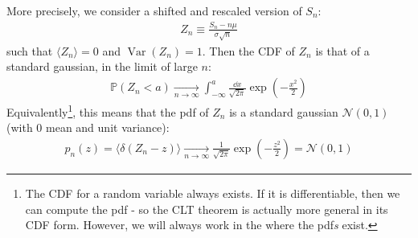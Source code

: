 \documentclass[../template.tex]{subfiles}
\begin{document}
\medskip

More precisely, we consider a shifted and rescaled version of $S_n$:
\begin{align*}
    Z_n \equiv \frac{S_n - n \mu}{\sigma\sqrt{n}} 
\end{align*}
such that $\langle Z_n \rangle = 0$ and $\operatorname{Var}(Z_n) = 1$. Then the CDF of $Z_n$ is that of a standard gaussian, in the limit of large $n$:
\begin{align*}
    \mathbb{P}(Z_n < a)  \xrightarrow[n \to \infty]{}  \int_{-\infty}^a \frac{\dd{x}}{\sqrt{2 \pi}}  \exp\left(-\frac{x^2}{2} \right) 
\end{align*} 
Equivalently\footnote{The CDF for a random variable always exists. If it is differentiable, then we can compute the pdf - so the CLT theorem is actually more general in its CDF form. However, we will always work in the  where the pdf\textit{s}  exist.},%
 this means that the pdf of $Z_n$ is a standard gaussian $\mathcal{N}(0,1)$ (with $0$ mean and unit variance):
\begin{align*}
    p_n(z) = \langle \delta(Z_n - z)  \rangle  \xrightarrow[n \to \infty]{}  \frac{1}{\sqrt{2 \pi}} \exp\left(-\frac{z^2}{2} \right) = \mathcal{N}(0,1)
\end{align*}

\medskip
\end{document}

